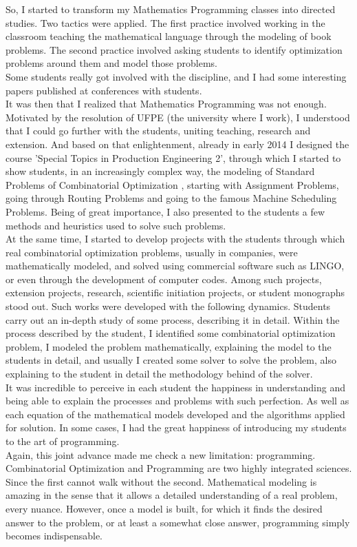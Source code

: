 \documentclass{book}
\begin{document}
So, I started to transform my Mathematics Programming classes into directed studies. Two tactics were applied. The first practice involved working in the classroom teaching the mathematical language through the modeling of book problems. The second practice involved asking students to identify optimization problems around them and model those problems. \\

Some students really got involved with the discipline, and I had some interesting papers published at conferences with students. \\

It was then that I realized that Mathematics Programming was not enough. Motivated by the resolution of UFPE (the university where I work), I understood that I could go further with the students, uniting teaching, research and extension. And based on that enlightenment, already in early 2014 I designed the course 'Special Topics in Production Engineering 2', through which I started to show students, in an increasingly complex way, the modeling of Standard Problems of Combinatorial Optimization , starting with Assignment Problems, going through Routing Problems and going to the famous Machine Scheduling Problems. Being of great importance, I also presented to the students a few methods and heuristics used to solve such problems. \\

At the same time, I started to develop projects with the students through which real combinatorial optimization problems, usually in companies, were mathematically modeled, and solved using commercial software such as LINGO, or even through the development of computer codes. Among such projects, extension projects, research, scientific initiation projects, or student monographs stood out. Such works were developed with the following dynamics. Students carry out an in-depth study of some process, describing it in detail. Within the process described by the student, I identified some combinatorial optimization problem, I modeled the problem mathematically, explaining the model to the students in detail, and usually I created some solver to solve the problem, also explaining to the student in detail the methodology behind of the solver. \\

It was incredible to perceive in each student the happiness in understanding and being able to explain the processes and problems with such perfection. As well as each equation of the mathematical models developed and the algorithms applied for solution. In some cases, I had the great happiness of introducing my students to the art of programming. \\

Again, this joint advance made me check a new limitation: programming. Combinatorial Optimization and Programming are two highly integrated sciences. Since the first cannot walk without the second. Mathematical modeling is amazing in the sense that it allows a detailed understanding of a real problem, every nuance. However, once a model is built, for which it finds the desired answer to the problem, or at least a somewhat close answer, programming simply becomes indispensable. \\
\end{document}
